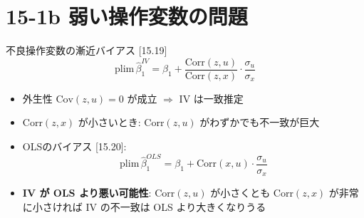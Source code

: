 \documentclass[
  ignorenonframetext,
]{beamer}
\providecommand{\tightlist}{%
  \setlength{\itemsep}{0pt}\setlength{\parskip}{0pt}}
\begin{document}
\section{15-1b
弱い操作変数の問題}\label{b-ux5f31ux3044ux64cdux4f5cux5909ux6570ux306eux554fux984c}

\begin{frame}{不良操作変数の漸近バイアス {[}15.19{]}}
\label{ux4e0dux826fux64cdux4f5cux5909ux6570ux306eux6f38ux8fd1ux30d0ux30a4ux30a2ux30b9-15.19}
\[\text{plim}\, \hat{\beta}_1^{IV} = \beta_1 + \frac{\text{Corr}(z, u)}{\text{Corr}(z, x)} \cdot \frac{\sigma_u}{\sigma_x}\]

\begin{itemize}
\tightlist
\item
  外生性 \(\text{Cov}(z, u) = 0\) が成立 \(\Rightarrow\) IV は一致推定
\item
  \(\text{Corr}(z, x)\) が小さいとき: \(\text{Corr}(z, u)\)
  がわずかでも不一致が巨大
\item
  OLSのバイアス {[}15.20{]}:
  \[\text{plim}\, \hat{\beta}_1^{OLS} = \beta_1 + \text{Corr}(x, u) \cdot \frac{\sigma_u}{\sigma_x}\]
\item
  \textbf{IV が OLS より悪い可能性}: \(\text{Corr}(z, u)\) が小さくとも
  \(\text{Corr}(z, x)\) が非常に小さければ IV の不一致は OLS
  より大きくなりうる
\end{itemize}
\end{frame}
\end{document}
